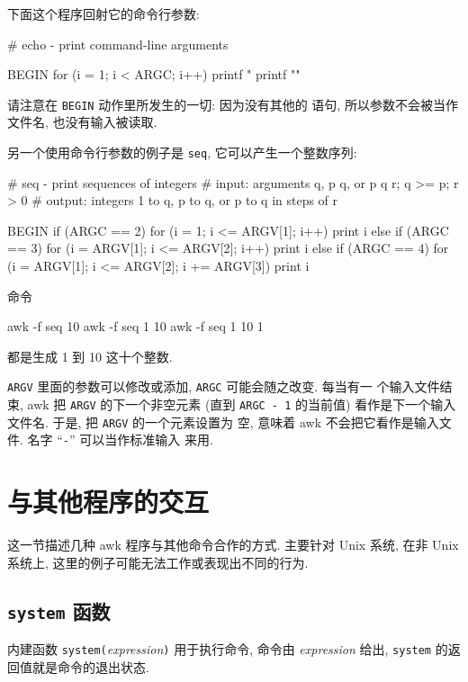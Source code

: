 下面这个程序回射它的命令行参数:
\begin{awkcode}
    # echo - print command-line arguments

    BEGIN {
        for (i = 1; i < ARGC; i++)
            printf "%
        printf "\n"
    }
\end{awkcode}
请注意在 \verb'BEGIN' 动作里所发生的一切: 因为没有其他的 \patact 语句, 
所以参数不会被当作文件名, 也没有输入被读取.

另一个使用命令行参数的例子是 \verb'seq', 它可以产生一个整数序列:
\begin{awkcode}
    # seq - print sequences of integers
    # input:  arguments q, p q, or p q r;  q >= p; r > 0
    # output: integers 1 to q, p to q, or p to q in steps of r

    BEGIN {
        if (ARGC == 2)
            for (i = 1; i <= ARGV[1]; i++)
                print i
        else if (ARGC == 3)
            for (i = ARGV[1]; i <= ARGV[2]; i++)
                print i
        else if (ARGC == 4)
            for (i = ARGV[1]; i <= ARGV[2]; i += ARGV[3])
                print i
    }
\end{awkcode}
命令 
\begin{awkcode}
    awk -f seq 10 
    awk -f seq 1 10 
    awk -f seq 1 10 1
\end{awkcode}
都是生成 1 到 10 这十个整数.

\verb'ARGV' 里面的参数可以修改或添加, \verb'ARGC' 可能会随之改变. 每当有一 
个输入文件结束, awk 把 \verb'ARGV' 的下一个非空元素 (直到 \verb'ARGC - 1'
的当前值) 看作是下一个输入文件名. 于是, 把 \verb'ARGV' 的一个元素设置为
空, 意味着 awk 不会把它看作是输入文件. 名字 ``\verb"-"'' 可以当作标准输入
来用.

\section{与其他程序的交互}
\label{sec:interaction_with_other_programs}

这一节描述几种 awk 程序与其他命令合作的方式. 主要针对 Unix 系统, 在非 
Unix 系统上, 这里的例子可能无法工作或表现出不同的行为.

\subsection{\texttt{system} 函数}
\label{subsec:the_system_function}

内建函数 \verb'system('\textit{expression}\verb')' 用于执行命令, 命令由 
\textit{expression} 给出, \verb'system' 的返回值就是命令的退出状态.

